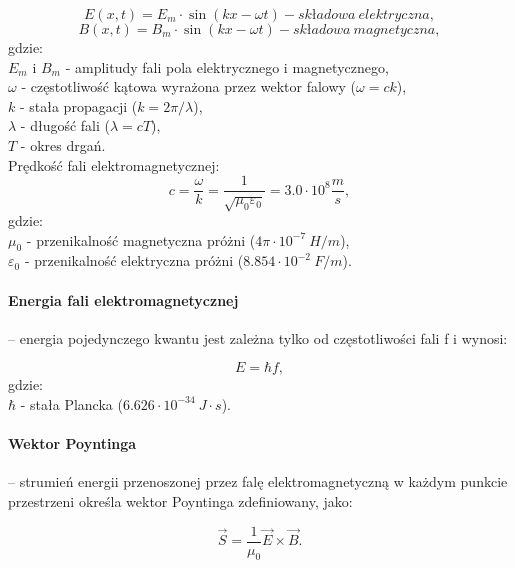 \documentclass[]{report}
\begin{document}
\begin{equation}
E(x,t) = E_m \cdot \sin (kx - \omega t) - składowa~elektryczna,
\end{equation}
\begin{equation}
B(x,t) = B_m \cdot \sin (kx - \omega t) - składowa~magnetyczna,
\end{equation}
gdzie:\\
$E_m$ i $B_m$ - amplitudy fali pola elektrycznego i magnetycznego,\\
$\omega$ - częstotliwość kątowa wyrażona przez wektor falowy ($\omega = ck$),\\
$k$ - stała propagacji ($k = 2\pi /\lambda$),\\
$\lambda$ - długość fali ($\lambda=cT$),\\
$T$ - okres drgań.\\

Prędkość fali elektromagnetycznej:
\begin{equation}
c=\dfrac{\omega}{k} = \dfrac{1}{\sqrt{\mu _0 \varepsilon _0}} = 3.0 \cdot 10^8 \dfrac{m}{s},
\end{equation}
gdzie:\\
$\mu _0$ - przenikalność magnetyczna próżni ($4\pi \cdot 10^{-7}~H/m$),\\
$\varepsilon _0$ - przenikalność elektryczna próżni ($8.854 \cdot 10^{-2}~F/m$).\\

\paragraph{Energia fali elektromagnetycznej} – energia pojedynczego kwantu jest zależna tylko od częstotliwości fali f i wynosi:

\begin{equation}
E = \hbar f,
\end{equation}
gdzie:\\
$\hbar$ - stała Plancka ($6.626 \cdot 10^{-34}~J \cdot s$). 

\paragraph{Wektor Poyntinga} – strumień energii przenoszonej przez falę elektromagnetyczną w każdym punkcie przestrzeni określa wektor Poyntinga zdefiniowany, jako:

\begin{equation}
\overrightarrow{S} = \dfrac{1}{\mu _0} \overrightarrow{E} \times \overrightarrow{B}.
\end{equation}
\end{document}
